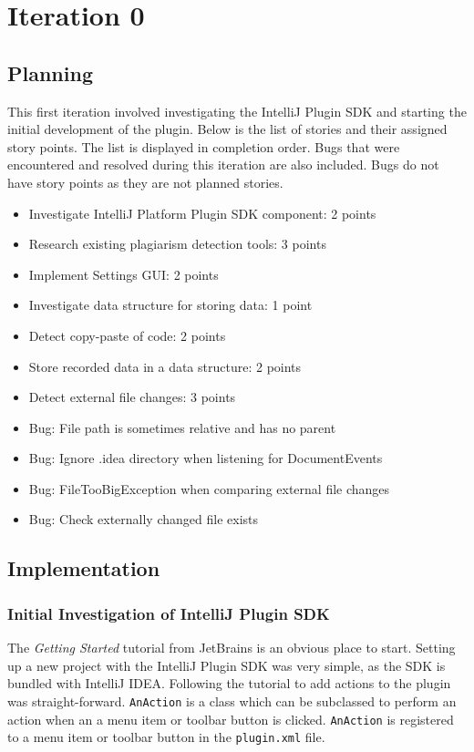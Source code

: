 \chapter{Iteration 0}
\section{Planning}
This first iteration involved investigating the IntelliJ Plugin SDK and starting the initial development of the plugin. Below is the list of stories and their assigned story points. The list is displayed in completion order. Bugs that were encountered and resolved during this iteration are also included. Bugs do not have story points as they are not planned stories.

\begin{itemize}
\item Investigate IntelliJ Platform Plugin SDK component: 2 points
\item Research existing plagiarism detection tools: 3 points
\item Implement Settings GUI: 2 points
\item Investigate data structure for storing data: 1 point
\item Detect copy-paste of code: 2 points
\item Store recorded data in a data structure: 2 points
\item Detect external file changes: 3 points
\item Bug: File path is sometimes relative and has no parent
\item Bug: Ignore .idea directory when listening for DocumentEvents
\item Bug: FileTooBigException when comparing external file changes
\item Bug: Check externally changed file exists
\end{itemize}

\section{Implementation}
\subsection{Initial Investigation of IntelliJ Plugin SDK}
The \textit{Getting Started} tutorial from JetBrains is an obvious place to start\cite{IntelliJGettingStarted}. Setting up a new project with the IntelliJ Plugin SDK was very simple, as the SDK is bundled with IntelliJ IDEA. Following the tutorial to add actions to the plugin was straight-forward. \texttt{AnAction} is a class which can be subclassed to perform an action when an a menu item or toolbar button is clicked. \texttt{AnAction} is registered to a menu item or toolbar button in the \texttt{plugin.xml} file.

